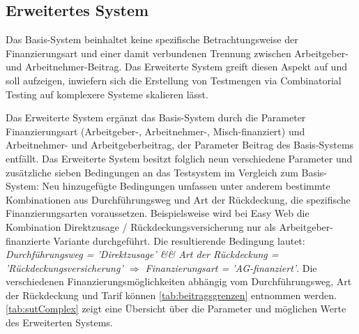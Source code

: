 \subsection{Erweitertes System}\label{subsec:ImplErweitertesModell}

Das Basis-System beinhaltet keine spezifische Betrachtungsweise der Finanzierungsart und einer damit verbundenen Trennung zwischen Arbeitgeber- und Arbeitnehmer-Beitrag. Das \glqq Erweiterte System\grqq{} greift diesen Aspekt auf und soll aufzeigen, inwiefern sich die Erstellung von Testmengen via Combinatorial Testing auf komplexere Systeme skalieren lässt.

Das Erweiterte System ergänzt das Basis-System durch die Parameter Finanzierungsart (Arbeitgeber-, Arbeitnehmer-, Misch-finanziert) und Arbeitnehmer- und Arbeitgeberbeitrag, der Parameter Beitrag des Basis-Systems entfällt. Das Erweiterte System besitzt folglich neun verschiedene Parameter und zusätzliche sieben Bedingungen an das Testsystem im Vergleich zum Basis-System: Neu hinzugefügte Bedingungen umfassen unter anderem bestimmte Kombinationen aus Durchführungsweg und Art der Rückdeckung, die spezifische Finanzierungsarten voraussetzen. Beispielsweise wird bei Easy Web die Kombination Direktzusage / Rückdeckungsversicherung nur als Arbeitgeber-finanzierte Variante durchgeführt. Die resultierende Bedingung lautet:\textit{ Durchführungsweg = 'Direktzusage' \&\& Art der Rückdeckung = 'Rückdeckungsversicherung' $\Rightarrow$ Finanzierungsart = 'AG-finanziert'}. Die verschiedenen Finanzierungsmöglichkeiten abhängig vom Durchführungsweg, Art der Rückdeckung und Tarif können \autoref{tab:beitragsgrenzen} entnommen werden. \autoref{tab:sutComplex} zeigt eine Übersicht über die Parameter und möglichen Werte des Erweiterten Systems.


